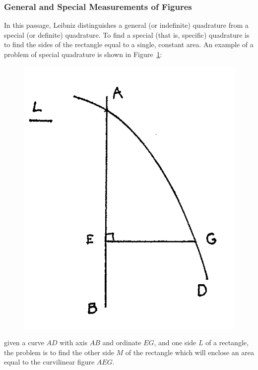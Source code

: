 \documentclass[polutonikogreek,english,twoside,openright]{article}
\begin{document}
\subsubsection*{General and Special Measurements of Figures}



In this passage, Leibniz distinguishes a general (or indefinite)
quadrature from a special (or definite) quadrature.  To find a special
(that is, specific) quadrature is to find the sides of the rectangle
equal to a single, constant area.  An example of a problem of special
quadrature is shown in Figure~\ref{fig25a}:
\begin{figure}[htp]
\begin{center}
\includegraphics[width=.5\textwidth]{fig/Figure29A}
\caption{}
\label{fig25a}
\end{center}
\end{figure} 
given a curve $AD$ with axis $AB$ and ordinate $EG$, and one side $L$
of a rectangle, the problem is to find the other side $M$ of the
rectangle which will enclose an area equal to the curvilinear figure
$AEG$.
	
\end{document}
